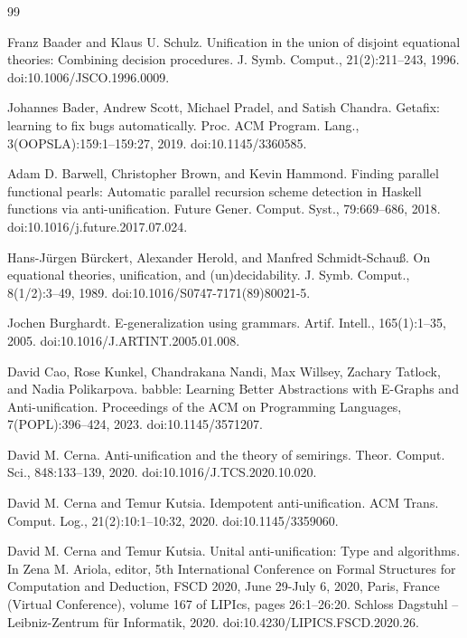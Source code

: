 \documentclass[10pt,a4paper]{amsart}
\begin{document}
\begin{thebibliography}{99}
\par\noindent  [7]  Franz Baader and Klaus U. Schulz.  Unification in the union of disjoint equational theories: Combining decision procedures.  J. Symb. Comput., 21(2):211–243, 1996.  doi:10.1006/JSCO.1996.0009.  
 
\par\noindent  [8]  Johannes Bader, Andrew Scott, Michael Pradel, and Satish Chandra.  Getafix: learning to fix bugs automatically.  Proc. ACM Program. Lang., 3(OOPSLA):159:1–159:27, 2019.  doi:10.1145/3360585.  
 
\par\noindent  [9]  Adam D. Barwell, Christopher Brown, and Kevin Hammond.  Finding parallel functional pearls: Automatic parallel recursion scheme detection in Haskell functions via anti-unification.  Future Gener. Comput. Syst., 79:669–686, 2018.  doi:10.1016/j.future.2017.07.024.  
 
\par\noindent  [10]  Hans-Jürgen Bürckert, Alexander Herold, and Manfred Schmidt-Schauß.  On equational theories, unification, and (un)decidability.  J. Symb. Comput., 8(1/2):3–49, 1989.  doi:10.1016/S0747-7171(89)80021-5.  
 
\par\noindent  [11]  Jochen Burghardt.  E-generalization using grammars.  Artif. Intell., 165(1):1–35, 2005.  doi:10.1016/J.ARTINT.2005.01.008.  
 
\par\noindent  [12]  David Cao, Rose Kunkel, Chandrakana Nandi, Max Willsey, Zachary Tatlock, and Nadia Polikarpova.  babble: Learning Better Abstractions with E-Graphs and Anti-unification.  Proceedings of the ACM on Programming Languages, 7(POPL):396–424, 2023.  doi:10.1145/3571207.  
 
\par\noindent  [13]  David M. Cerna.  Anti-unification and the theory of semirings.  Theor. Comput. Sci., 848:133–139, 2020.  doi:10.1016/J.TCS.2020.10.020.  
 
\par\noindent  [14]  David M. Cerna and Temur Kutsia.  Idempotent anti-unification.  ACM Trans. Comput. Log., 21(2):10:1–10:32, 2020.  doi:10.1145/3359060.  
 
\par\noindent  [15]  David M. Cerna and Temur Kutsia.  Unital anti-unification: Type and algorithms.  In Zena M. Ariola, editor, 5th International Conference on Formal Structures for Computation and Deduction, FSCD 2020, June 29-July 6, 2020, Paris, France (Virtual Conference), volume 167 of LIPIcs, pages 26:1–26:20. Schloss Dagstuhl – Leibniz-Zentrum für Informatik, 2020.  doi:10.4230/LIPICS.FSCD.2020.26.  
 

\end{thebibliography}
\end{document}

